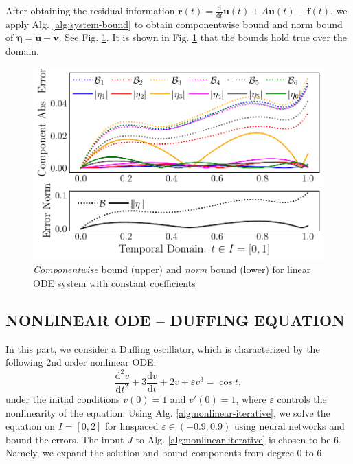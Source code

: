 \documentclass[accepted]{uai2023}
\newcommand{\vect}[1]{\mathbf{#1}}
\newcommand{\Err}{\eta}
\begin{document}
    After obtaining the residual information $\vect{r}(t)=\frac{\mathrm d}{\mathrm d t}\vect{u}(t) + A\vect{u}(t) - \vect{f}(t)$, we apply Alg. \ref{alg:system-bound} to obtain componentwise bound and norm bound of $\pmb{\Err} = \vect{u}-\vect{v}$. See Fig. \ref{fig:system-bound}. It is shown in Fig. \ref{fig:system-bound} that the bounds hold true over the domain.

    \begin{figure}[!htp]
        \centering
        \includegraphics[width=\linewidth]{assets/system-bound.pdf}
        \caption{\small \textit{Componentwise} bound (upper) and \textit{norm} bound (lower) for linear ODE system with constant coefficients}\label{fig:system-bound}
    \end{figure}
\subsection{NONLINEAR ODE -- DUFFING EQUATION} \label{section:experiment-duffing}
    In this part, we consider a Duffing oscillator, which is characterized by the following $2$nd order nonlinear ODE:
    \begin{equation}\label{eq:duffing}
        \frac{\mathrm{d}^2 v}{\mathrm{d}t^2} + 3 \frac{\mathrm{d}v}{\mathrm{d}t} + 2v +\varepsilon v^3 = \cos t ,
    \end{equation}
    under the initial conditions $v(0) = 1$ and $v'(0) = 1$, where $\varepsilon$ controls the nonlinearity of the equation. Using Alg. \ref{alg:nonlinear-iterative}, we solve the equation on $I=[0, 2]$ for linspaced $\varepsilon \in (-0.9, 0.9)$ using neural networks and bound the errors. The input $J$ to Alg. \ref{alg:nonlinear-iterative} is chosen to be $6$. Namely, we expand the solution and bound components from degree $0$ to $6$.
\end{document}
